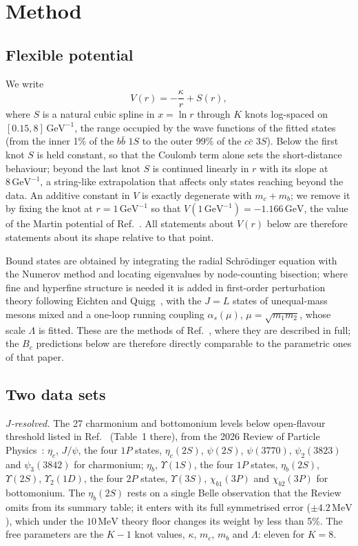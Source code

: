 \documentclass[10pt,twocolumn]{article}
\newcommand{\Bc}{B_c}
\newcommand{\cc}{c\bar c}
\newcommand{\bb}{b\bar b}
\newcommand{\MeV}{\,\mathrm{MeV}}
\newcommand{\GeV}{\,\mathrm{GeV}}
\newcommand{\GeVi}{\,\mathrm{GeV}^{-1}}
\begin{document}
\section{Method}
\label{sec:method}

\subsection{Flexible potential}

We write
\begin{equation}
  V(r) = -\frac{\kappa}{r} + S(r),
  \label{eq:V}
\end{equation}
where $S$ is a natural cubic spline in $x=\ln r$ through $K$ knots log-spaced on $[0.15, 8]\GeVi$, the range occupied by the wave functions of the fitted states (from the inner 1\% of the $\bb$ $1S$ to the outer 99\% of the $\cc$ $3S$).
Below the first knot $S$ is held constant, so that the Coulomb term alone sets the short-distance behaviour; beyond the last knot $S$ is continued linearly in $r$ with its slope at $8\GeVi$, a string-like extrapolation that affects only states reaching beyond the data.
An additive constant in $V$ is exactly degenerate with $m_c+m_b$; we remove it by fixing the knot at $r=1\GeVi$ so that $V(1\GeVi)=-1.166\GeV$, the value of the Martin potential of Ref.~\cite{Eichten1994}.
All statements about $V(r)$ below are therefore statements about its shape relative to that point.

Bound states are obtained by integrating the radial Schrödinger equation with the Numerov method and locating eigenvalues by node-counting bisection; where fine and hyperfine structure is needed it is added in first-order perturbation theory following Eichten and Quigg~\cite{Eichten1994}, with the $J=L$ states of unequal-mass mesons mixed and a one-loop running coupling $\alpha_s(\mu)$, $\mu=\sqrt{m_1m_2}$, whose scale $\Lambda$ is fitted.
These are the methods of Ref.~\cite{Oppong2026}, where they are described in full; the $\Bc$ predictions below are therefore directly comparable to the parametric ones of that paper.

\subsection{Two data sets}

\emph{$J$-resolved.}
The 27 charmonium and bottomonium levels below open-flavour threshold listed in Ref.~\cite{Oppong2026} (Table~1 there), from the 2026 Review of Particle Physics~\cite{PDG2026}: $\eta_c$, $J/\psi$, the four $1P$ states, $\eta_c(2S)$, $\psi(2S)$, $\psi(3770)$, $\psi_2(3823)$ and $\psi_3(3842)$ for charmonium; $\eta_b$, $\Upsilon(1S)$, the four $1P$ states, $\eta_b(2S)$, $\Upsilon(2S)$, $\Upsilon_2(1D)$, the four $2P$ states, $\Upsilon(3S)$, $\chi_{b1}(3P)$ and $\chi_{b2}(3P)$ for bottomonium.
The $\eta_b(2S)$ rests on a single Belle observation that the Review omits from its summary table; it enters with its full symmetrised error ($\pm4.2\MeV$), which under the $10\MeV$ theory floor changes its weight by less than 5\%.
The free parameters are the $K-1$ knot values, $\kappa$, $m_c$, $m_b$ and $\Lambda$: eleven for $K=8$.
\end{document}
